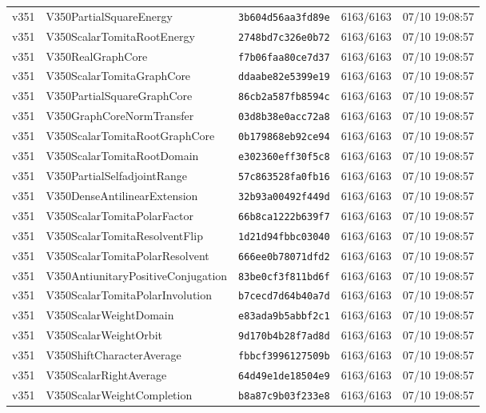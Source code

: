 \documentclass[11pt]{article}
\theoremstyle{definition}\newtheorem{deriv}{Derivação}
\begin{document}
{\begin{longtable}{@{}lllll@{}}
v351 & V350PartialSquareEnergy & \texttt{3b604d56aa3fd89e} & 6163/6163 & 07/10 19:08:57 \\
v351 & V350ScalarTomitaRootEnergy & \texttt{2748bd7c326e0b72} & 6163/6163 & 07/10 19:08:57 \\
v351 & V350RealGraphCore & \texttt{f7b06faa80ce7d37} & 6163/6163 & 07/10 19:08:57 \\
v351 & V350ScalarTomitaGraphCore & \texttt{ddaabe82e5399e19} & 6163/6163 & 07/10 19:08:57 \\
v351 & V350PartialSquareGraphCore & \texttt{86cb2a587fb8594c} & 6163/6163 & 07/10 19:08:57 \\
v351 & V350GraphCoreNormTransfer & \texttt{03d8b38e0acc72a8} & 6163/6163 & 07/10 19:08:57 \\
v351 & V350ScalarTomitaRootGraphCore & \texttt{0b179868eb92ce94} & 6163/6163 & 07/10 19:08:57 \\
v351 & V350ScalarTomitaRootDomain & \texttt{e302360eff30f5c8} & 6163/6163 & 07/10 19:08:57 \\
v351 & V350PartialSelfadjointRange & \texttt{57c863528fa0fb16} & 6163/6163 & 07/10 19:08:57 \\
v351 & V350DenseAntilinearExtension & \texttt{32b93a00492f449d} & 6163/6163 & 07/10 19:08:57 \\
v351 & V350ScalarTomitaPolarFactor & \texttt{66b8ca1222b639f7} & 6163/6163 & 07/10 19:08:57 \\
v351 & V350ScalarTomitaResolventFlip & \texttt{1d21d94fbbc03040} & 6163/6163 & 07/10 19:08:57 \\
v351 & V350ScalarTomitaPolarResolvent & \texttt{666ee0b78071dfd2} & 6163/6163 & 07/10 19:08:57 \\
v351 & V350AntiunitaryPositiveConjugation & \texttt{83be0cf3f811bd6f} & 6163/6163 & 07/10 19:08:57 \\
v351 & V350ScalarTomitaPolarInvolution & \texttt{b7cecd7d64b40a7d} & 6163/6163 & 07/10 19:08:57 \\
v351 & V350ScalarWeightDomain & \texttt{e83ada9b5abbf2c1} & 6163/6163 & 07/10 19:08:57 \\
v351 & V350ScalarWeightOrbit & \texttt{9d170b4b28f7ad8d} & 6163/6163 & 07/10 19:08:57 \\
v351 & V350ShiftCharacterAverage & \texttt{fbbcf3996127509b} & 6163/6163 & 07/10 19:08:57 \\
v351 & V350ScalarRightAverage & \texttt{64d49e1de18504e9} & 6163/6163 & 07/10 19:08:57 \\
v351 & V350ScalarWeightCompletion & \texttt{b8a87c9b03f233e8} & 6163/6163 & 07/10 19:08:57 \\

\end{longtable}}
\end{document}
